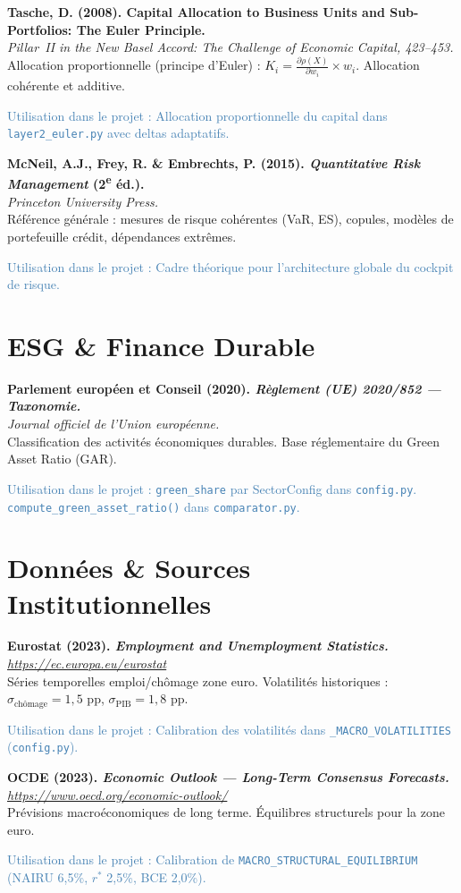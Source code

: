 \documentclass[12pt,a4paper]{article}
\newcommand{\bibentry}[4]{%
  \noindent\textbf{#1}\\
  \textit{#2}\\
  #3\par
  \textcolor{steelblue}{\footnotesize\textsf{Utilisation dans le projet :} #4}\par
  \medskip
}
\begin{document}
\bibentry{Tasche, D. (2008). Capital Allocation to Business Units and Sub-Portfolios: The Euler Principle.}{\emph{Pillar~II in the New Basel Accord: The Challenge of Economic Capital}, 423--453.}{Allocation proportionnelle (principe d'Euler) : $K_i = \frac{\partial \rho(X)}{\partial w_i} \times w_i$. Allocation cohérente et additive.}{Allocation proportionnelle du capital dans \texttt{layer2\_euler.py} avec deltas adaptatifs.}

\bibentry{McNeil, A.J., Frey, R. \& Embrechts, P. (2015). \emph{Quantitative Risk Management} (2\textsuperscript{e} éd.).}{Princeton University Press.}{Référence générale : mesures de risque cohérentes (VaR, ES), copules, modèles de portefeuille crédit, dépendances extrêmes.}{Cadre théorique pour l'architecture globale du cockpit de risque.}

\section{ESG \& Finance Durable}

\bibentry{Parlement européen et Conseil (2020). \emph{Règlement (UE) 2020/852 --- Taxonomie.}}{Journal officiel de l'Union européenne.}{Classification des activités économiques durables. Base réglementaire du Green Asset Ratio (GAR).}{\texttt{green\_share} par SectorConfig dans \texttt{config.py}. \texttt{compute\_green\_asset\_ratio()} dans \texttt{comparator.py}.}

\section{Données \& Sources Institutionnelles}

\bibentry{Eurostat (2023). \emph{Employment and Unemployment Statistics.}}{\url{https://ec.europa.eu/eurostat}}{Séries temporelles emploi/chômage zone euro. Volatilités historiques : $\sigma_\text{chômage} = 1{,}5$ pp, $\sigma_\text{PIB} = 1{,}8$ pp.}{Calibration des volatilités dans \texttt{\_MACRO\_VOLATILITIES} (\texttt{config.py}).}

\bibentry{OCDE (2023). \emph{Economic Outlook --- Long-Term Consensus Forecasts.}}{\url{https://www.oecd.org/economic-outlook/}}{Prévisions macroéconomiques de long terme. Équilibres structurels pour la zone euro.}{Calibration de \texttt{MACRO\_STRUCTURAL\_EQUILIBRIUM} (NAIRU 6,5\%, $r^*$ 2,5\%, BCE 2,0\%).}
\end{document}
